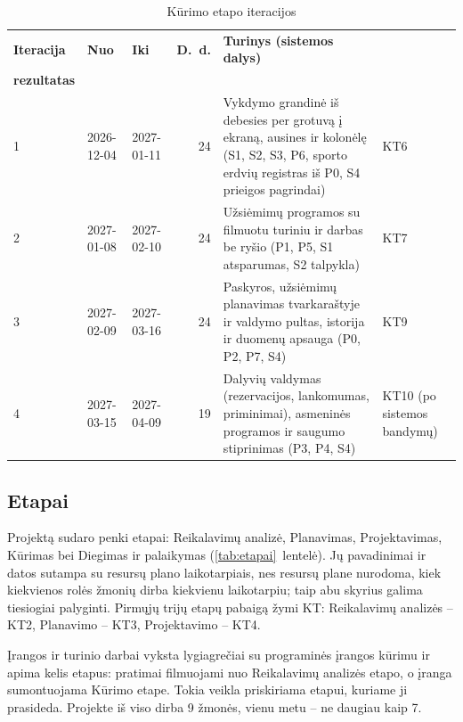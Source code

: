 \begin{table}[H]
  \centering
  \caption{Kūrimo etapo iteracijos}
  \label{tab:iteracijos}
  \small
  \begin{tabularx}{\textwidth}{@{}lllr>{\raggedright\arraybackslash}X>{\raggedright\arraybackslash}p{2.1cm}@{}}
    \toprule
    \textbf{Iteracija} & \textbf{Nuo} & \textbf{Iki} & \textbf{D.~d.} & \textbf{Turinys (sistemos dalys)} & \makecell[lb]{\textbf{Tarpinis}\\\textbf{rezultatas}} \\
    \midrule
    1 & 2026-12-04 & 2027-01-11 & 24 & Vykdymo grandinė iš debesies per grotuvą į ekraną, ausines ir kolonėlę (S1, S2, S3, P6, sporto erdvių registras iš P0, S4 prieigos pagrindai) & KT6 \\
    2 & 2027-01-08 & 2027-02-10 & 24 & Užsiėmimų programos su filmuotu turiniu ir darbas be ryšio (P1, P5, S1 atsparumas, S2 talpykla) & KT7 \\
    3 & 2027-02-09 & 2027-03-16 & 24 & Paskyros, užsiėmimų planavimas tvarkaraštyje ir valdymo pultas, istorija ir duomenų apsauga (P0, P2, P7, S4) & KT9 \\
    4 & 2027-03-15 & 2027-04-09 & 19 & Dalyvių valdymas (rezervacijos, lankomumas, priminimai), asmeninės programos ir saugumo stiprinimas (P3, P4, S4) & KT10 (po sistemos bandymų) \\
    \bottomrule
  \end{tabularx}
\end{table}

\subsection{Etapai}

Projektą sudaro penki etapai: Reikalavimų analizė, Planavimas,
Projektavimas, Kūrimas bei Diegimas ir palaikymas (\ref{tab:etapai}~lentelė).
Jų pavadinimai ir datos sutampa su resursų plano laikotarpiais, nes resursų
plane nurodoma, kiek kiekvienos rolės žmonių dirba kiekvienu laikotarpiu;
taip abu skyrius galima tiesiogiai palyginti. Pirmųjų trijų etapų pabaigą
žymi KT: Reikalavimų analizės – KT2, Planavimo – KT3,
Projektavimo – KT4.

Įrangos ir turinio darbai vyksta lygiagrečiai su programinės įrangos kūrimu
ir apima kelis etapus: pratimai filmuojami nuo Reikalavimų analizės etapo,
o įranga sumontuojama Kūrimo etape. Tokia veikla priskiriama etapui, kuriame
ji prasideda. Projekte iš viso dirba 9 žmonės, vienu metu – ne daugiau
kaip 7.

